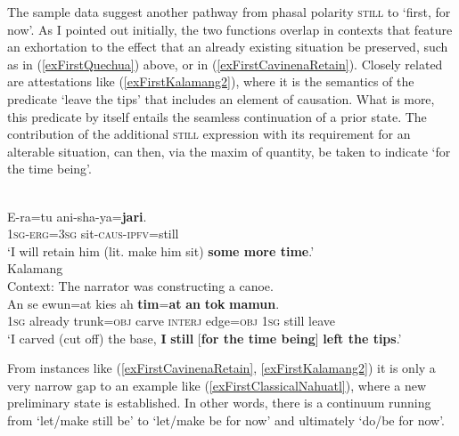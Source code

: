 The sample data suggest another pathway from phasal polarity \textsc{still} to \lq first, for now\rq{}. As I pointed out initially, the two functions overlap in contexts that feature an exhortation to the effect that an already existing situation be preserved, such as in (\ref{exFirstQuechua}) above, or in (\ref{exFirstCavinenaRetain}). Closely related are attestations like (\ref{exFirstKalamang2}), where it is the semantics of the predicate \lq leave the tips\rq{ }that includes an element of causation. What is more, this predicate by itself entails the seamless continuation of a prior state. The contribution of the additional \textsc{still} expression with its requirement for an alterable situation,  can then, via the maxim of quantity, be taken to indicate \lq for the time being\rq{}.\largerpage[2.25]

\begin{exe}
	\ex {}\label{exFirstCavinenaRetain}\\
	\gll E-ra=tu ani-sha-ya=\textbf{jari}.\\
	1\textsc{sg}-\textsc{erg}=3\textsc{sg} sit-\textsc{caus}-\textsc{ipfv}=still\\
	\glt \lq I will retain him (lit. make him sit) \textbf{some more time}.'
	\\\parencite[289]{Guillaume2008}
	\ex Kalamang\label{exFirstKalamang2}\\
	Context: The narrator was constructing a canoe.\\
	\gll An se ewun=at kies ah \textbf{tim}=\textbf{at} \textbf{an} \textbf{tok} \textbf{mamun}.\\
	1\textsc{sg} already trunk=\textsc{obj} carve \textsc{interj} edge=\textsc{obj} 1\textsc{sg} still leave\\
	\glt \lq I carved (cut off) the base, \textbf{I} \textbf{still} [\textbf{for the time being}] \textbf{left the tips}.\rq{ }\parencite{Visser2021b}	
\end{exe}

From instances like (\ref{exFirstCavinenaRetain}, \ref{exFirstKalamang2}) it is only a very narrow gap to an example like (\ref{exFirstClassicalNahuatl}), where a new preliminary state is established. In other words, there is a continuum running from \lq let/make still be\rq{ }to \lq let/make be for now\rq{ }and ultimately \lq do/be for now\rq{}.

